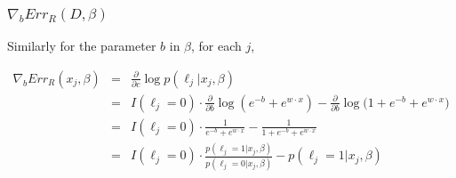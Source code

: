\documentclass{article}
\begin{document}
\subsubsection{$ \nabla_{b}{Err_R (D, \beta)}$}

Similarly for the parameter $b$ in $\beta$, for each $j$,

\begin{eqnarray*}
\nabla_{b}{Err_R (x_j, \beta)} &=& \frac{\partial}{\partial c}\log{p(\ell_j | x_j, \beta)} \\
 &=& I(\ell_j=0) \cdot \frac{\partial}{\partial b}
		\log{  \left( e^{-b} + e^{w \cdot x} \right) }
		- \frac{\partial}{\partial b}
		 \log{\bigg(
			1 + e^{-b} + e^{w \cdot x}
		\bigg)} \\
 &=& I(\ell_j=0) \cdot
		\frac{1}{e^{-b} + e^{w \cdot x}}
		-
		 \frac{1}{
			1 + e^{-b} + e^{w \cdot x}
		} \\
 &=& I(\ell_j=0) \cdot
		\frac{p(\ell_j=1 | x_j,\beta)}{p(\ell_j=0 | x_j,\beta)}
		-
		 p(\ell_j=1 | x_j,\beta)
\end{eqnarray*}
\end{document}
